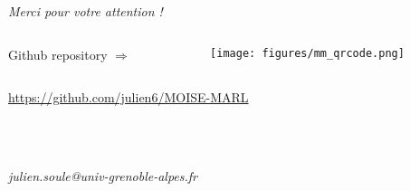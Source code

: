 

\section*{\phantom{Thanks}}

\begin{frame}{}

  \vspace{6ex}

  \centering
  {
    \Huge
    \emph{Merci pour votre attention !}
  }

  \vspace{6ex}

  \begin{columns}

    \hspace{-27ex}

    \begin{column}{0.5\textwidth}
      \raggedleft
      {\Large Github repository $\Longrightarrow$}
    \end{column}

    \hspace{-12ex}

    \begin{column}{0.5\textwidth}
      \texttt{[image: figures/mm\_qrcode.png]}
    \end{column}

  \end{columns}

  \vspace{3ex}

  \centering
  {\Large
    \url{https://github.com/julien6/MOISE-MARL}}

  \ \\
  
  \

  \textit{julien.soule@univ-grenoble-alpes.fr}

\end{frame}
